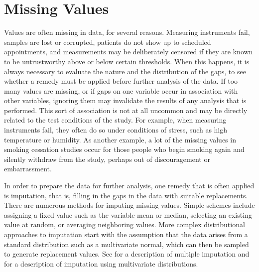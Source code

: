 


\chapter{Missing Values}


Values are often missing in data, for several reasons.  Measuring
instruments fail, samples are lost or corrupted, patients do not show
up to scheduled appointments, and measurements may be deliberately
censored if they are known to be untrustworthy above or below certain
thresholds.  When this happens, it is always necessary to evaluate the
nature and the distribution of the gaps, to see whether a remedy must be
applied before further analysis of the data.  If too many values are
missing, or if gaps on one variable occur in association with other
variables, ignoring them may invalidate the results of any analysis
that is performed.  This sort of association is not at all uncommon
and may be directly related to the test conditions of the study.  For
example, when measuring instruments fail, they often do so under
conditions of stress, such as high temperature or humidity.  As
another example, a lot of the missing values in smoking cessation
studies occur for those people who begin smoking again %
and silently withdraw from the study, perhaps out of discouragement or
embarrassment.


In order to prepare the data for further analysis, one remedy that is
often applied is imputation, that is, filling in the gaps in the data
with suitable replacements.  There are numerous methods for imputing
missing values. Simple schemes include assigning a fixed value such as
the variable mean or median, selecting an existing value at random, or
averaging neighboring values. More complex distributional approaches
to imputation start with the assumption that the data arises from a
standard distribution such as a multivariate normal, which can then be
sampled to generate replacement values. See  for a
description of multiple imputation and 
for a description of imputation using multivariate distributions.


